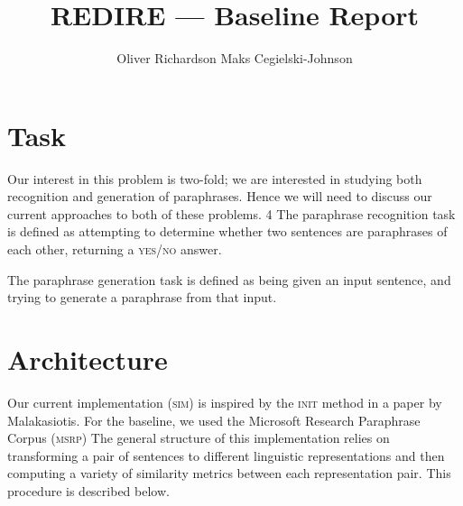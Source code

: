 \documentclass[11pt, reqno]{amsart}
\newcommand{\mala}{Malakasiotis}
\begin{document}
	\title{REDIRE --- Baseline Report}
	
	\author{\textsc Oliver Richardson \hspace{2em} Maks Cegielski-Johnson}
	
	\maketitle 
	
	\vspace{-2em}
	
	\section{Task}

	Our interest in this problem is two-fold; we are interested in studying both recognition and generation of paraphrases. Hence we will need to discuss our current approaches to both of these problems. 
4	
	The paraphrase recognition task is defined as attempting to determine whether two sentences are paraphrases of each other, returning a \textsc{yes/no} answer.
	
	The paraphrase generation task is defined as being given an input sentence, and trying to generate a paraphrase from that input. %
	

	
	\section{Architecture}
	Our current implementation (\textsc{sim}) is inspired by the \textsc{init} method in a paper by \mala \cite{malakasiotis2009paraphrase}. For the baseline, we used the Microsoft Research Paraphrase Corpus\cite{msrp} (\textsc{msrp})  The general structure of this implementation relies on transforming a pair of sentences to different linguistic representations and then computing a variety of similarity metrics between each representation pair. This procedure is described below.
	
\end{document}
